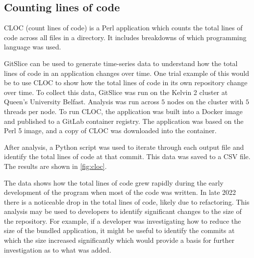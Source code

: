 \subsection{Counting lines of code}
\label{subsec:counting-lines-of-code}

CLOC (count lines of code) is a Perl application which counts the total lines of code across all files in a directory.
It includes breakdowns of which programming language was used.

GitSlice can be used to generate time-series data to understand how the total lines of code in an application changes over time.
One trial example of this would be to use CLOC to show how the total lines of code in its own repository change over time.
To collect this data, GitSlice was run on the Kelvin 2 cluster at Queen's University Belfast.
Analysis was run across $ 5 $ nodes on the cluster with $ 5 $ threads per node.
To run CLOC, the application was built into a Docker image and published to a GitLab container registry.
The application was based on the Perl 5 image, and a copy of CLOC was downloaded into the container.

After analysis, a Python script was used to iterate through each output file and identify the total lines of code at that commit.
This data was saved to a CSV file.
The results are shown in \autoref{fig:cloc}.

\begin{center}
    \label{fig:cloc}
\end{center}

The data shows how the total lines of code grew rapidly during the early development of the program when most of the code was written.
In late 2022 there is a noticeable drop in the total lines of code, likely due to refactoring.
This analysis may be used to developers to identify significant changes to the size of the repository.
For example, if a developer was investigating how to reduce the size of the bundled application, it might be useful to identify the commits at which the size increased significantly which would provide a basis for further investigation as to what was added.

